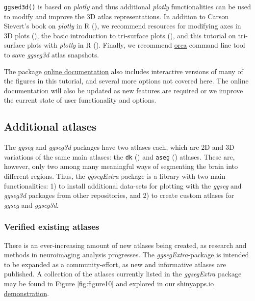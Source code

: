 \documentclass[fleqn,10pt]{wlpeerj} %
\begin{document}
\texttt{ggsed3d()} is based on \emph{plotly} and thus additional \emph{plotly} functionalities can be used to modify and improve the 3D atlas representations.
In addition to Carson Sievert's book on \emph{plotly} in R (\citeyearpar{plotly}), we recommend resources for modifying axes in 3D plots (\citet{plotly-ax}), the basic introduction to tri-surface plots (\citet{plotly-tri}), and this tutorial on tri-surface plots with \emph{plotly} in R (\citet{plotly-trisurf}).
Finally, we recommend \href{https://github.com/plotly/orca\#installation}{orca} command line tool to save \emph{ggseg3d} atlas snapshots.

The package \href{https://lcbc-uio.github.io/ggseg3d/articles/ggseg3d.html}{online documentation} also includes interactive versions of many of the figures in this tutorial, and several more options not covered here.
The online documentation will also be updated as new features are required or we improve the current state of user functionality and options.

\hypertarget{additional-atlases}{%
\subsection{Additional atlases}\label{additional-atlases}}

The \emph{ggseg} and \emph{ggseg3d} packages have two atlases each, which are 2D and 3D variations of the same main atlases: the \texttt{dk} (\citet{dk}) and \texttt{aseg} (\citet{aseg}) atlases.
These are, however, only two among many meaningful ways of segmenting the brain into different regions.
Thus, the \emph{ggsegExtra} package is a library with two main functionalities: 1) to install additional data-sets for plotting with the \emph{ggseg} and \emph{ggseg3d} packages from other repositories, and 2) to create custom atlases for \emph{ggseg} and \emph{ggseg3d}.

\hypertarget{verified-existing-atlases}{%
\subsubsection{Verified existing atlases}\label{verified-existing-atlases}}

There is an ever-increasing amount of new atlases being created, as research and methods in neuroimaging analysis progresses.
The \emph{ggsegExtra}-package is intended to be expanded as a community-effort, as new and informative atlases are published.
A collection of the atlases currently listed in the \emph{ggsegExtra} package may be found in Figure \ref{fig:figure10} and explored in our \href{https://athanasiamo.shinyapps.io/ggsegDemo/}{shinyapps.io demonstration}.
\end{document}
